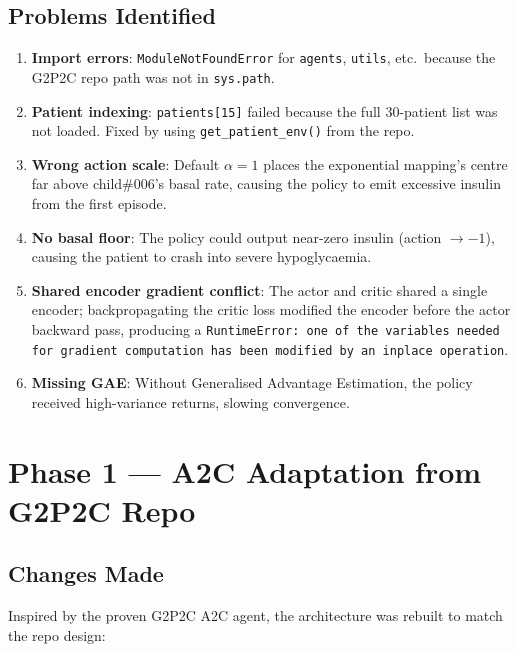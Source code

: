 \documentclass[11pt,a4paper]{article}
\begin{document}
\subsection{Problems Identified}
\begin{enumerate}
    \item \textbf{Import errors}: \texttt{ModuleNotFoundError} for \texttt{agents}, \texttt{utils},
          etc.\ because the G2P2C repo path was not in \texttt{sys.path}.
    \item \textbf{Patient indexing}: \texttt{patients[15]} failed because the full 30-patient
          list was not loaded. Fixed by using \texttt{get\_patient\_env()} from the repo.
    \item \textbf{Wrong action scale}: Default $\alpha = 1$ places the exponential mapping's
          centre far above child\#006's basal rate, causing the policy to emit excessive insulin
          from the first episode.
    \item \textbf{No basal floor}: The policy could output near-zero insulin (action $\to -1$),
          causing the patient to crash into severe hypoglycaemia.
    \item \textbf{Shared encoder gradient conflict}: The actor and critic shared a single
          encoder; backpropagating the critic loss modified the encoder before the actor
          backward pass, producing a \texttt{RuntimeError: one of the variables needed for
          gradient computation has been modified by an inplace operation}.
    \item \textbf{Missing GAE}: Without Generalised Advantage Estimation, the policy received
          high-variance returns, slowing convergence.
\end{enumerate}

\section{Phase 1 — A2C Adaptation from G2P2C Repo}

\subsection{Changes Made}
Inspired by the proven G2P2C A2C agent, the architecture was rebuilt to match the repo design:
\end{document}
